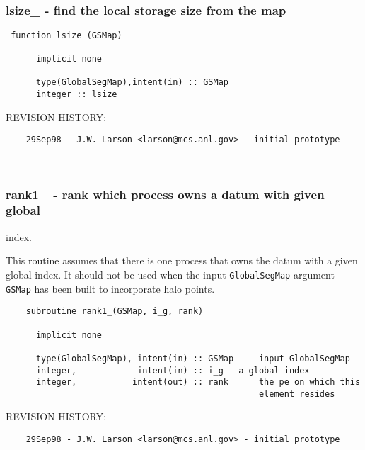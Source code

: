  
\mbox{}\hrulefill\ 
 

 \subsubsection{lsize\_ - find the local storage size from the map}


 
 
\begin{verbatim} 
 function lsize_(GSMap)
 
      implicit none
 
      type(GlobalSegMap),intent(in) :: GSMap
      integer :: lsize_
 \end{verbatim}{\sf REVISION HISTORY:}
\begin{verbatim}  	29Sep98 - J.W. Larson <larson@mcs.anl.gov> - initial prototype\end{verbatim}
 
 
\mbox{}\hrulefill\ 
 

 \subsubsection{rank1\_ - rank which process owns a datum with given global }


  index.
 
  This routine assumes that there is one process that owns the datum with
  a given global index.  It should not be used when the input 
  {\tt GlobalSegMap} argument {\tt GSMap} has been built to incorporate
  halo points.
 
\begin{verbatim} 
    subroutine rank1_(GSMap, i_g, rank)
 
      implicit none
 
      type(GlobalSegMap), intent(in) :: GSMap     input GlobalSegMap
      integer,            intent(in) :: i_g	  a global index
      integer,           intent(out) :: rank      the pe on which this
                                                  element resides\end{verbatim}{\sf REVISION HISTORY:}
\begin{verbatim}  	29Sep98 - J.W. Larson <larson@mcs.anl.gov> - initial prototype\end{verbatim}
 
